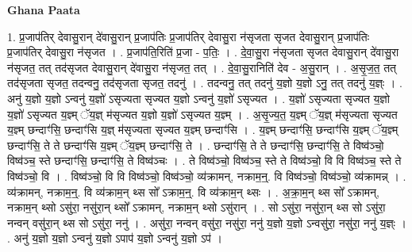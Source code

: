\documentclass[17pt]{extarticle}
\begin{document}
\textbf{Ghana Paata } \newline

1. प्र॒जाप॑तिर् देवासु॒रान् दे॑वासु॒रान् प्र॒जाप॑तिः प्र॒जाप॑तिर् देवासु॒रा न॑सृजता सृजत देवासु॒रान् प्र॒जाप॑तिः प्र॒जाप॑तिर् देवासु॒रा न॑सृजत । . प्र॒जाप॑ति॒रिति॑ प्र॒जा - प॒तिः॒ । . दे॒वा॒सु॒रा न॑सृजता सृजत देवासु॒रान् दे॑वासु॒रा न॑सृजत॒ तत् तद॑सृजत देवासु॒रान् दे॑वासु॒रा न॑सृजत॒ तत् । . दे॒वा॒सु॒रानिति॑ देव - अ॒सु॒रान् । . अ॒सृ॒ज॒त॒ तत् तद॑सृजता सृजत॒ तदन्वनु॒ तद॑सृजता सृजत॒ तदनु॑ । . तदन्वनु॒ तत् तदनु॑ य॒ज्ञो य॒ज्ञो ऽनु॒ तत् तदनु॑ य॒ज्ञ्ः । . अनु॑ य॒ज्ञो य॒ज्ञो ऽन्वनु॑ य॒ज्ञो॑ ऽसृज्यता सृज्यत य॒ज्ञो ऽन्वनु॑ य॒ज्ञो॑ ऽसृज्यत । . य॒ज्ञो॑ ऽसृज्यता सृज्यत य॒ज्ञो य॒ज्ञो॑ ऽसृज्यत य॒ज्ञ्म् ॅय॒ज्ञ् म॑सृज्यत य॒ज्ञो य॒ज्ञो॑ ऽसृज्यत य॒ज्ञ्म् । . अ॒सृ॒ज्य॒त॒ य॒ज्ञ्म् ॅय॒ज्ञ् म॑सृज्यता सृज्यत य॒ज्ञ्म् छन्दाꣳ॑सि॒ छन्दाꣳ॑सि य॒ज्ञ् म॑सृज्यता सृज्यत य॒ज्ञ्म् छन्दाꣳ॑सि । . य॒ज्ञ्म् छन्दाꣳ॑सि॒ छन्दाꣳ॑सि य॒ज्ञ्म् ॅय॒ज्ञ्म् छन्दाꣳ॑सि॒ ते ते छन्दाꣳ॑सि य॒ज्ञ्म् ॅय॒ज्ञ्म् छन्दाꣳ॑सि॒ ते । . छन्दाꣳ॑सि॒ ते ते छन्दाꣳ॑सि॒ छन्दाꣳ॑सि॒ ते विष्व॑ञ्चो॒ विष्व॑ञ्च॒ स्ते छन्दाꣳ॑सि॒ छन्दाꣳ॑सि॒ ते विष्व॑ञ्चः । . ते विष्व॑ञ्चो॒ विष्व॑ञ्च॒ स्ते ते विष्व॑ञ्चो॒ वि वि विष्व॑ञ्च॒ स्ते ते विष्व॑ञ्चो॒ वि । . विष्व॑ञ्चो॒ वि वि विष्व॑ञ्चो॒ विष्व॑ञ्चो॒ व्य॑क्रामन्, नक्राम॒न्॒. वि विष्व॑ञ्चो॒ विष्व॑ञ्चो॒ व्य॑क्रामन्न् । . व्य॑क्रामन्, नक्राम॒न्॒. वि व्य॑क्राम॒न् थ्स सो᳚ ऽक्राम॒न्॒. वि व्य॑क्राम॒न् थ्सः । . अ॒क्रा॒म॒न् थ्स सो᳚ ऽक्रामन्, नक्राम॒न् थ्सो ऽसु॑रा॒ नसु॑रा॒न् थ्सो᳚ ऽक्रामन्, नक्राम॒न् थ्सो ऽसु॑रान् । . सो ऽसु॑रा॒ नसु॑रा॒न् थ्स सो ऽसु॑रा॒ नन्वन् वसु॑रा॒न् थ्स सो ऽसु॑रा॒ ननु॑ । . असु॑रा॒ नन्वन् वसु॑रा॒ नसु॑रा॒ ननु॑ य॒ज्ञो य॒ज्ञो ऽन्वसु॑रा॒ नसु॑रा॒ ननु॑ य॒ज्ञ्ः । . अनु॑ य॒ज्ञो य॒ज्ञो ऽन्वनु॑ य॒ज्ञो ऽपाप॑ य॒ज्ञो ऽन्वनु॑ य॒ज्ञो ऽप॑ । \newline
\end{document}
